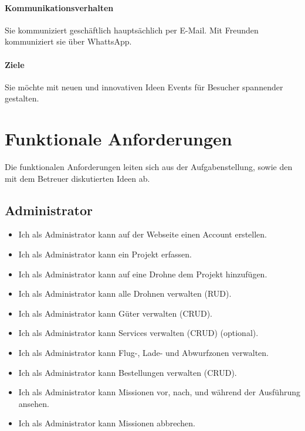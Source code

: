 \paragraph{Kommunikationsverhalten}
Sie kommuniziert geschäftlich hauptsächlich per E-Mail. Mit Freunden kommuniziert sie über WhattsApp.

\paragraph{Ziele} 
Sie möchte mit neuen und innovativen Ideen Events für Besucher spannender gestalten.

\section{Funktionale Anforderungen}

Die funktionalen Anforderungen leiten sich aus der Aufgabenstellung, sowie den mit dem Betreuer diskutierten Ideen ab. 

\subsection{Administrator}
\begin{itemize}
\item Ich als Administrator kann auf der Webseite einen Account erstellen.
\item Ich als Administrator kann ein Projekt erfassen.
\item Ich als Administrator kann auf eine Drohne dem Projekt hinzufügen.
\item Ich als Administrator kann alle Drohnen verwalten (RUD).
\item Ich als Administrator kann Güter verwalten (CRUD).
\item Ich als Administrator kann Services verwalten (CRUD) (optional).
\item Ich als Administrator kann Flug-, Lade- und Abwurfzonen verwalten.
\item Ich als Administrator kann Bestellungen verwalten (CRUD).
\item Ich als Administrator kann Missionen vor, nach, und während der Ausführung ansehen.
\item Ich als Administrator kann Missionen abbrechen.
\end{itemize}

